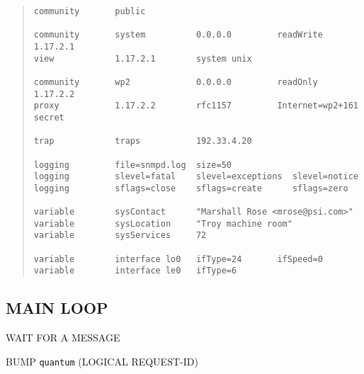 \begin{bwslide}

\begin{quote}\small\begin{verbatim}
community       public

community       system          0.0.0.0         readWrite           1.17.2.1
view            1.17.2.1        system unix

community       wp2             0.0.0.0         readOnly            1.17.2.2
proxy           1.17.2.2        rfc1157         Internet=wp2+161    secret

trap            traps           192.33.4.20

logging         file=snmpd.log  size=50
logging         slevel=fatal    slevel=exceptions  slevel=notice
logging         sflags=close    sflags=create      sflags=zero

variable        sysContact      "Marshall Rose <mrose@psi.com>"
variable        sysLocation     "Troy machine room"
variable        sysServices     72

variable        interface lo0   ifType=24       ifSpeed=0
variable        interface le0   ifType=6
\end{verbatim}\end{quote}
\end{bwslide}


\begin{bwslide}
\part*	{MAIN LOOP}\bf

\begin{nrtc}
\item	WAIT FOR A MESSAGE

\item	BUMP \verb"quantum" (LOGICAL REQUEST-ID)
\end{nrtc}
\end{bwslide}






